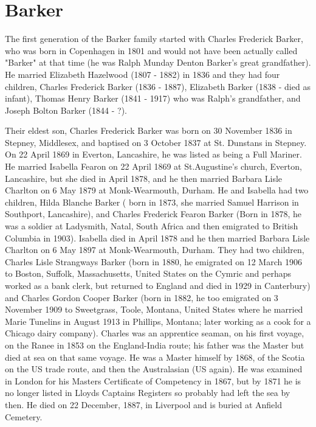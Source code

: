 \section{Barker}
The first generation of the Barker family started with Charles Frederick Barker, who was born in Copenhagen in 1801  and would not have been actually called "Barker" at that time (he was Ralph Munday Denton Barker's great grandfather). He married  Elizabeth Hazelwood (1807 - 1882) in 1836 and they had four children,  Charles Frederick Barker (1836 - 1887), Elizabeth Barker (1838 - died as infant), Thomas Henry Barker (1841 - 1917) who was Ralph's grandfather, and Joseph Bolton Barker (1844 - ?).

Their eldest son,  Charles Frederick Barker was born on 30 November 1836 in Stepney, Middlesex, and baptised on 3 October 1837 at St. Dunstans in Stepney. On 22 April 1869 in Everton, Lancashire, he was listed as being a Full Mariner. He married Isabella Fearon on 22 April 1869 at St.Augustine's church,	Everton, Lancashire, but  she died in April 1878, and he then married Barbara Lisle Charlton on	6 May 1879 at	Monk-Wearmouth, Durham.  He and Isabella had two children, Hilda Blanche Barker ( born in 1873, she married Samuel Harrison in Southport, Lancashire), and Charles Frederick Fearon Barker (Born in 1878, he was a soldier at Ladysmith, Natal, South Africa and then emigrated to British Columbia in 1903). Isabella died in April 1878 and he then married Barbara Lisle Charlton on 6 May 1897 at Monk-Wearmouth, Durham. They had two children, Charles Lisle Strangways Barker (born in 1880, he emigrated on 12 March 1906 to	Boston, Suffolk, Massachusetts, United States on the Cymric and perhaps worked as a bank clerk, but returned to England and died in 1929 in Canterbury) and Charles Gordon Cooper Barker (born in 1882, he too emigrated on 3 November 1909 to	Sweetgrass, Toole, Montana, United States where he married Marie Tunelins in August 1913 in Phillips, Montana; later working as a cook for a Chicago dairy company).
Charles was an apprentice seaman, on his first voyage, on the Ranee in 1853 on the England-India route; his father was the Master but died at sea on that same voyage. He was a Master himself by 1868, of the Scotia on the US trade route, and then the Australasian (US again). He was examined in London for his Masters Certificate of Competency in 1867, but by 1871 he is no longer listed in Lloyds Captains Registers so probably had left the sea by then. He died on 22 December, 1887,  in Liverpool and is buried at Anfield Cemetery.



